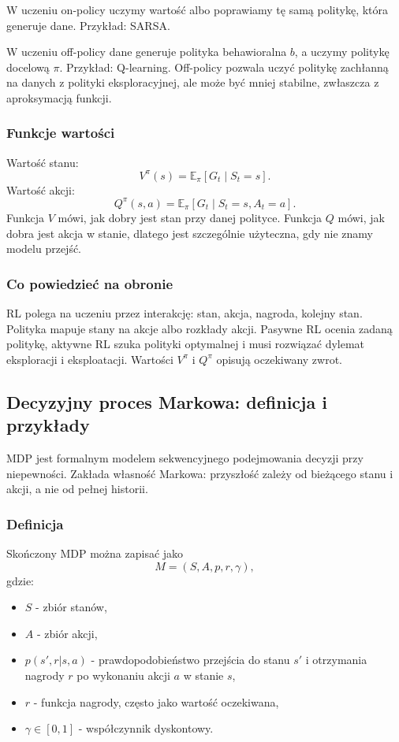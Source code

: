 W uczeniu on-policy uczymy wartość albo poprawiamy tę samą politykę, która generuje dane. Przykład: SARSA.

W uczeniu off-policy dane generuje polityka behawioralna $b$, a uczymy politykę docelową $\pi$. Przykład: Q-learning. Off-policy pozwala uczyć politykę zachłanną na danych z polityki eksploracyjnej, ale może być mniej stabilne, zwłaszcza z aproksymacją funkcji.

\subsubsection{Funkcje wartości}

Wartość stanu:
\[
V^\pi(s)=\mathbb{E}_\pi[G_t\mid S_t=s].
\]
Wartość akcji:
\[
Q^\pi(s,a)=\mathbb{E}_\pi[G_t\mid S_t=s,A_t=a].
\]
Funkcja $V$ mówi, jak dobry jest stan przy danej polityce. Funkcja $Q$ mówi, jak dobra jest akcja w stanie, dlatego jest szczególnie użyteczna, gdy nie znamy modelu przejść.

\subsubsection{Co powiedzieć na obronie}

RL polega na uczeniu przez interakcję: stan, akcja, nagroda, kolejny stan. Polityka mapuje stany na akcje albo rozkłady akcji. Pasywne RL ocenia zadaną politykę, aktywne RL szuka polityki optymalnej i musi rozwiązać dylemat eksploracji i eksploatacji. Wartości $V^\pi$ i $Q^\pi$ opisują oczekiwany zwrot.

\subsection{Decyzyjny proces Markowa: definicja i przykłady}

MDP jest formalnym modelem sekwencyjnego podejmowania decyzji przy niepewności. Zakłada własność Markowa: przyszłość zależy od bieżącego stanu i akcji, a nie od pełnej historii.

\subsubsection{Definicja}

Skończony MDP można zapisać jako
\[
M=(S,A,p,r,\gamma),
\]
gdzie:
\begin{itemize}
  \item $S$ - zbiór stanów,
  \item $A$ - zbiór akcji,
  \item $p(s',r|s,a)$ - prawdopodobieństwo przejścia do stanu $s'$ i otrzymania nagrody $r$ po wykonaniu akcji $a$ w stanie $s$,
  \item $r$ - funkcja nagrody, często jako wartość oczekiwana,
  \item $\gamma\in[0,1]$ - współczynnik dyskontowy.
\end{itemize}

